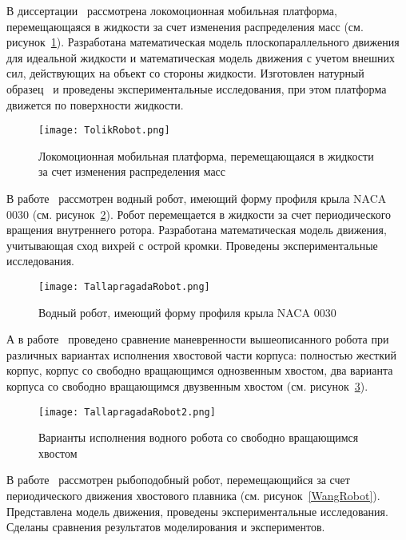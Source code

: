 В диссертации~\cite{Klenov_diss} рассмотрена локомоционная мобильная платформа, перемещающаяся в жидкости за счет изменения распределения масс (см. рисунок~\ref{TolikRobot}). Разработана математическая модель плоскопараллельного движения для идеальной жидкости и математическая модель движения с учетом внешних сил, действующих на объект со стороны жидкости. Изготовлен натурный образец~\cite{patent_BNR} и проведены экспериментальные исследования, при этом платформа движется по поверхности жидкости.

\begin{figure}[h]
	\centering
	\texttt{[image: TolikRobot.png]}%
	\caption{Локомоционная мобильная платформа, перемещающаяся в жидкости за счет изменения распределения масс}
	\label{TolikRobot}
\end{figure}

В работе~\cite{Tallapragada_2015} рассмотрен водный робот, имеющий форму профиля крыла NACA 0030 (см. рисунок~\ref{TallapragadaRobot}). Робот перемещается в жидкости за счет периодического вращения внутреннего ротора. Разработана математическая модель движения, учитывающая сход вихрей с острой кромки. Проведены экспериментальные исследования. 

\begin{figure}[h]
	\centering
	\texttt{[image: TallapragadaRobot.png]}%
	\caption{Водный робот, имеющий форму профиля крыла NACA 0030}
	\label{TallapragadaRobot}
\end{figure}

А в работе~\cite{Pollard_Tallapragada_2019} проведено сравнение маневренности вышеописанного робота при различных вариантах исполнения хвостовой части корпуса: полностью жесткий корпус, корпус со свободно вращающимся однозвенным хвостом, два варианта корпуса со свободно вращающимся двузвенным хвостом (см. рисунок~\ref{TallapragadaRobot2}).

\begin{figure}[h]
	\centering
	\texttt{[image: TallapragadaRobot2.png]}%
	\caption{Варианты исполнения водного робота со свободно вращающимся хвостом}
	\label{TallapragadaRobot2}
\end{figure}

В работе~\cite{Wang_Tan} рассмотрен рыбоподобный робот, перемещающийся за счет периодического движения хвостового плавника (см. рисунок~\ref{WangRobot}). Представлена модель движения, проведены экспериментальные исследования. Сделаны сравнения результатов моделирования и экспериментов.

